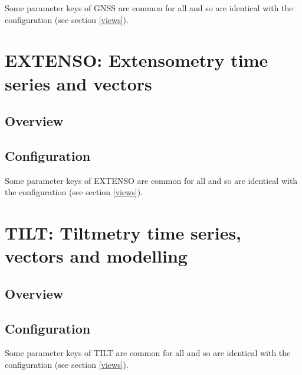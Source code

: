 Some parameter keys of GNSS are common for all  and  so are identical with the  configuration (see section \ref{views}).




\section{EXTENSO: Extensometry time series and vectors}

\subsection{Overview}

\subsection{Configuration}

Some parameter keys of EXTENSO are common for all  and  so are identical with the  configuration (see section \ref{views}).




\section{TILT: Tiltmetry time series, vectors and modelling}

\subsection{Overview}

\subsection{Configuration}

Some parameter keys of TILT are common for all  and  so are identical with the  configuration (see section \ref{views}).

